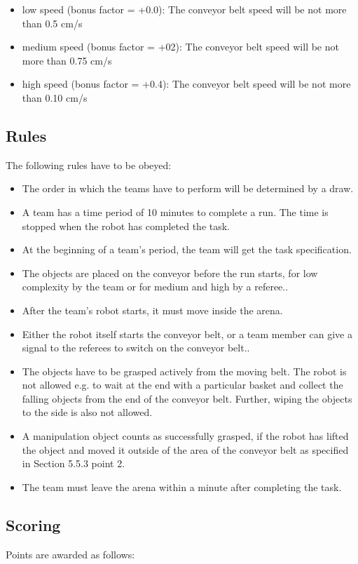 \begin{itemize}
\item low speed (bonus factor = +0.0): The conveyor belt speed will be not more than 0.5 cm/s
\item medium speed (bonus factor = +02):	The conveyor belt speed will be not more than 0.75 cm/s
\item high speed (bonus factor = +0.4): The conveyor belt speed will be not more than 0.10 cm/s
\end{itemize}



\subsection{Rules}
The following rules have to be obeyed:

\begin{itemize}
\item The order in which the teams have to perform will be determined by a draw.
\item A team has a time period of 10 minutes to complete a run. The time is stopped when the robot has completed the task.
\item At the beginning of a team’s period, the team will get the task specification.
\item The objects are placed on the conveyor before the run starts, for low complexity by the team or for medium and high by a referee..
\item After the team’s robot starts, it must move inside the arena.
\item Either the robot itself starts the conveyor belt, or a team member can give a signal to the referees to switch on the conveyor belt..
\item The objects have to be grasped actively from the moving belt. The robot is not allowed e.g. to wait at the end with a particular basket and collect the falling objects from the end of the conveyor belt. Further, wiping the objects to the side is also not allowed.
\item A manipulation object counts as successfully grasped, if the robot has lifted the object and moved it outside of the area of the conveyor belt as specified in Section 5.5.3 point 2.
\item The team must leave the arena within a minute after completing the task.
\end{itemize}




\subsection{Scoring}
Points are awarded as follows:

